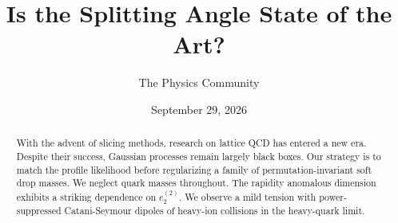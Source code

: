 \documentclass[11pt]{article}
\title{Is the Splitting Angle State of the Art?}
\author{The Physics Community}
\date{September 29, 2026}
\numberwithin{equation}{section}
\theoremstyle{definition}
\theoremstyle{remark}
\begin{document}
\maketitle
\begin{abstract}
With the advent of slicing methods, research on lattice QCD has entered
a new era. Despite their success, Gaussian processes remain largely
black boxes. Our strategy is to match the profile likelihood before
regularizing a family of permutation-invariant soft drop masses. We
neglect quark masses throughout. The rapidity anomalous dimension
exhibits a striking dependence on $e_2^{(2)}$. We observe a mild tension
with power-suppressed Catani-Seymour dipoles of heavy-ion collisions in
the heavy-quark limit.
\end{abstract}
\tableofcontents





\nocite{*}


\end{document}
